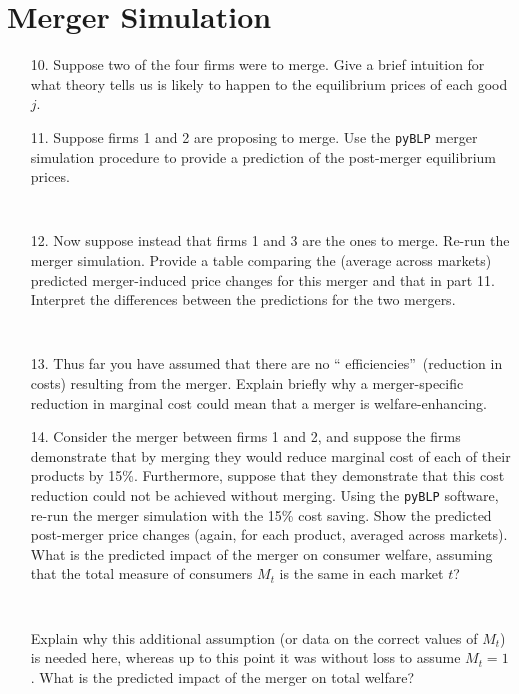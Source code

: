 \documentclass[english,11pt]{article}
\begin{document}
\begin{enumerate}
\begin{enumerate}
\end{enumerate}

\section{Merger Simulation}

\begin{enumerate}
\item[10.] Suppose two of the four firms were to merge. Give a brief
intuition for what theory tells us is likely to happen to the equilibrium
prices of each good $j$.



\item[11.] Suppose firms 1 and 2 are proposing to merge. Use the \texttt{pyBLP}
merger simulation procedure to provide a prediction of the post-merger
equilibrium prices.

\begin{verbatim}
    
\end{verbatim}

\item[12.] Now suppose instead that firms 1 and 3 are the ones to merge.
Re-run the merger simulation. Provide a table comparing the (average
across markets) predicted merger-induced price changes for this merger and
that in part 11. Interpret the differences between the predictions for the
two mergers.

\begin{verbatim}
    
\end{verbatim}

\item[13.] Thus far you have assumed that there are no \textquotedblleft
efficiencies\textquotedblright\ (reduction in costs) resulting from the
merger. Explain briefly why a merger-specific reduction in marginal cost
could mean that a merger is welfare-enhancing.

\item[14.] Consider the merger between firms 1 and 2, and suppose the firms
demonstrate that by merging they would reduce marginal cost of each of their
products by 15\%. Furthermore, suppose that they demonstrate that this cost
reduction could not be achieved without merging.    Using the \texttt{pyBLP} software, re-run the merger simulation
with the 15\% cost saving. Show the predicted post-merger price changes (again,
for each product, averaged across markets). What is the predicted impact of
the merger on consumer welfare, assuming that the total measure of consumers $%
M_{t} $ is the same in each market  $t$?  

\begin{verbatim}
    
\end{verbatim}

Explain why this additional assumption
(or data on the correct values of $M_{t}$) is needed here, whereas up to
this point it was without loss to assume $M_{t}=1$. What is the predicted
impact of the merger on total welfare?
\end{enumerate}
\end{document}
